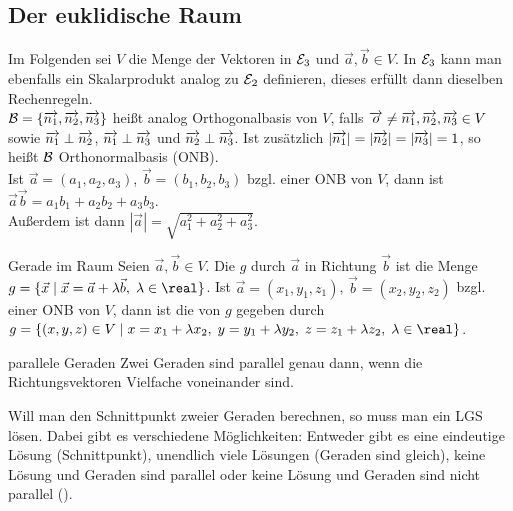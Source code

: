 \subsection{%
    Der euklidische Raum%
}


\begin{Bem}
    Im Folgenden sei $V$ die Menge der Vektoren in $\mathcal{E}_3$ und
    $\vec{a}, \vec{b} \in V$.
    In $\mathcal{E}_3$ kann man ebenfalls ein Skalarprodukt analog zu $\mathcal{E}_2$
    definieren, dieses erfüllt dann dieselben Rechenregeln. \\
    $\mathcal{B} = \{\overrightarrow{n_1}, \overrightarrow{n_2}, \overrightarrow{n_3}\}$ heißt analog
    Orthogonalbasis von $V$, falls
    $\overrightarrow{o} \not= \overrightarrow{n_1}, \overrightarrow{n_2}, \overrightarrow{n_3} \in V$ sowie
    $\overrightarrow{n_1} \;\bot\; \overrightarrow{n_2}$, $\overrightarrow{n_1} \;\bot\; \overrightarrow{n_3}$ und
    $\overrightarrow{n_2} \;\bot\; \overrightarrow{n_3}$.
    Ist zusätzlich $|\overrightarrow{n_1}| = |\overrightarrow{n_2}| = |\overrightarrow{n_3}| = 1$,
    so heißt $\mathcal{B}$ Orthonormalbasis (ONB). \\
    Ist $\vec{a} = (a_1, a_2, a_3)$, $\vec{b} = (b_1, b_2, b_3)$ bzgl. einer
    ONB von $V$, dann ist
    $\vec{a} \vec{b} = a_1 b_1 + a_2 b_2 + a_3 b_3$. \\
    Außerdem ist dann $|\vec{a}| = \sqrt{a_1^2 + a_2^2 + a_3^2}$.
\end{Bem}

\begin{Def}{Gerade im Raum}
    Seien $\vec{a}, \vec{b} \in V$.
    Die  $g$ durch $\vec{a}$ in Richtung $\vec{b}$ ist die
    Menge $g = \{\vec{x} \;|\; \vec{x} = \vec{a} + \lambda \vec{b},\;
    \lambda \in \real\}$.
    Ist $\vec{a} = (x_1, y_1, z_1)$, $\vec{b} = (x_2, y_2, z_2)$ bzgl. einer
    ONB von $V$, dann ist die  von $g$ gegeben
    durch $g = \{(x, y, z) \in V \;|\; x = x_1 + \lambda x_2,\;
    y = y_1 + \lambda y_2,\; z = z_1 + \lambda z_2,\; \lambda \in \real\}$.
\end{Def}

\begin{Lemma}{parallele Geraden}
    Zwei Geraden sind parallel genau dann, wenn die Richtungsvektoren Vielfache
    voneinander sind.
\end{Lemma}

\pagebreak

\begin{Bem}
    Will man den Schnittpunkt zweier Geraden berechnen, so muss man ein LGS
    lösen.
    Dabei gibt es verschiedene Möglichkeiten:
    Entweder gibt es eine eindeutige Lösung (Schnittpunkt), unendlich
    viele Lösungen (Geraden sind gleich), keine Lösung und Geraden sind
    parallel oder keine Lösung und Geraden sind nicht parallel
    ().
\end{Bem}

